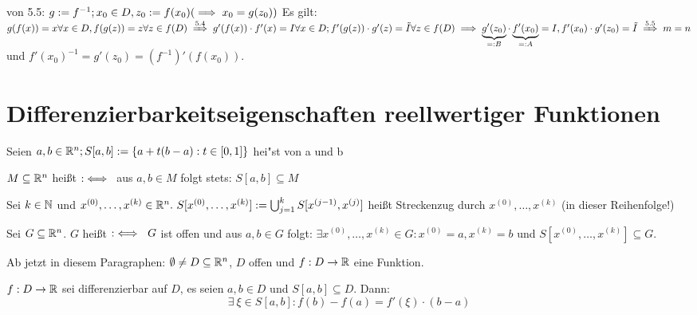 \documentclass[a4paper,twoside,DIV15,BCOR12mm]{scrbook}
\begin{document}
\begin{beweis} von 5.5: $g:=f^{-1}; x_0 \in D, z_0:=f(x_0) (\implies x_0 = g(z_0))$
Es gilt: $g(f(x)) = x \forall x \in D, f(g(z)) = z \forall z \in f(D) \folgtnach{5.4} g'(f(x))\cdot f'(x) = I \forall x \in D; f'(g(z))\cdot g'(z) = \tilde{I}
\forall z \in f(D) \folgt \underbrace{g'(z_0)}_{=:B}\cdot \underbrace{f'(x_0)}_{=:A} = I, f'(x_0)\cdot g'(z_0) = \tilde{I} \folgtnach{5.5} m = n$ und $f'(x_0)^{-1} = g'(z_0) = (f^{-1})'(f(x_0))$.
\end{beweis}

\theoremstyle{numberbreak}
\newtheorem{spezialfall}[satz]{Spezialfall}
\chapter{Differenzierbarkeitseigenschaften reellwertiger Funktionen}
\def\grad{\mathop{\rm grad}\nolimits}

\begin{definition}
\begin{liste}
\item Seien $a,b \in \mathbb{R}^n; S[a,b]:=\{a+t(b-a): t\in [0,1]\}$ hei"st
 von a und b
\item $M\subseteq \mathbb{R}^n$ heißt  $:\iff$\ aus $a,b \in M$ folgt
stets: $S[a,b] \subseteq M$
\item Sei $k \in \mathbb{N}$ und $x^{(0)},\ldots,x^{(k)} \in \MdR^n.\ S[x^{(0)},\ldots,x^{(k)}]:=\bigcup_{j=1}^{k}S[x^{(j-1)}, x^{(j)}]$ heißt Streckenzug durch $x^{(0)},\ldots,x^{(k)}$ (in dieser Reihenfolge!)
\item Sei $G \subseteq \mathbb{R}^n$. $G$ heißt $:\iff\ G$ ist offen und aus $a,b \in G$ folgt: $\exists x^{(0)},\ldots,x^{(k)} \in G: x^{(0)}=a, x^{(k)}=b$ und $S[x^{(0)},\ldots,x^{(k)}] \subseteq G$.
\end{liste}
\end{definition}

\begin{vereinbarung}
Ab jetzt in diesem Paragraphen: $\emptyset \ne D \subseteq \mathbb{R}^n$, $D$ offen und
$f:D\to \mathbb{R}$ eine Funktion.
\end{vereinbarung}

\begin{satz}
$f:D\to\mathbb{R}$ sei differenzierbar auf $D$, es seien $a,b \in D$ und $S[a,b]\subseteq D$. Dann: $$\exists\ \xi \in S[a,b]: f(b)-f(a)=f'(\xi)\cdot(b-a)$$
$ $%
\end{satz}
\end{document}
